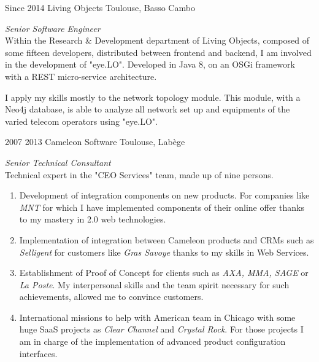 \documentclass{friggeri-cv} 	%
\begin{document}
\begin{entrylist}
\entry
{Since 2014}
{Living Objects}
{Toulouse, Basso Cambo}
{\vspace{0.2cm}\emph{Senior Software Engineer} \\
Within the Research \& Development department of Living Objects, composed of some fifteen developers,
distributed between frontend and backend, I am involved in the development of "eye.LO".
Developed in Java 8, on an OSGi framework with a REST micro-service architecture.

I apply my skills mostly to the network topology module. This module, with a Neo4j database, is able to analyze all 
network set up and equipments of the varied telecom operators using "eye.LO".
\\}

\entry
{2007  2013}
{Cameleon Software}
{Toulouse, Labège}
{\vspace{0.2cm}\emph{Senior Technical Consultant} \\
Technical expert in the "CEO Services" team, made up of nine persons.

\begin{enumerate}
	\item Development of integration components on new products. For companies like \textit{MNT} for which I have implemented components of their online offer thanks to my mastery in 2.0 web technologies.

	\item Implementation of integration between Cameleon products and CRMs such as \textit{Selligent} for customers like \textit{Gras Savoye} thanks to my skills in Web Services.

	\item Establishment of Proof of Concept for clients such as \textit{AXA, MMA, SAGE} or \textit{La Poste}. My interpersonal skills and the team spirit necessary for such achievements, allowed me to convince customers.

	\item International missions to help with American team in Chicago with some huge SaaS projects as \textit{Clear Channel} and \textit{Crystal Rock}. For those projects I am in charge of the implementation of advanced product configuration interfaces.


\end{enumerate}}
\end{entrylist}
\end{document}
